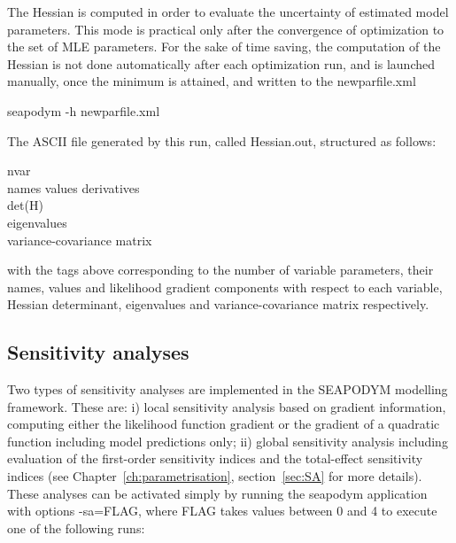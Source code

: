 The Hessian is computed in order to evaluate the uncertainty of estimated model parameters. This mode is practical only after the convergence of optimization to the set of MLE parameters. For the sake of time saving, the computation of the Hessian is not done automatically after each optimization run, and is launched manually, once the minimum is attained, and written to the {\ttfamily newparfile.xml}

\vspace{0.35cm}

{\ttfamily
  seapodym -h newparfile.xml
}
\vspace{0.35cm}

\noindent The ASCII file generated by this run, called {\ttfamily Hessian.out}, structured as follows: 

\vspace{0.35cm}
{\ttfamily
\noindent 
\indent nvar\\
\indent names values derivatives\\
\indent det(H)\\
\indent eigenvalues\\
\indent variance-covariance matrix\\
}

\noindent with the tags above corresponding to the number of variable parameters, their names, values and likelihood gradient components with respect to each variable, Hessian determinant, eigenvalues and variance-covariance matrix respectively.

\subsection{Sensitivity analyses}\label{sec:sensitivity-run}
Two types of sensitivity analyses are implemented in the SEAPODYM modelling framework. These are: i) local sensitivity analysis based on gradient information, computing either the likelihood function gradient or the gradient of a quadratic function including model predictions only; ii) global sensitivity analysis including evaluation of the first-order sensitivity indices and the total-effect sensitivity indices (see Chapter~\ref{ch:parametrisation}, section~\ref{sec:SA} for more details). These analyses can be activated simply by running the {\ttfamily seapodym} application with options {\ttfamily -sa=FLAG}, where {\ttfamily FLAG} takes values between 0 and 4 to execute one of the following runs: 

